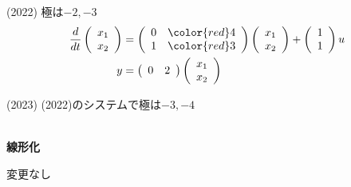 (2022) 極は{\color{red}$-2, -3$}
\begin{align*}
	\frac{d}{dt}
	\left (
	\begin{array}{c}
	 x_1 \\ x_2 
	\end{array}
	\right )
	& = 
	\left (
	\begin{array}{cc}
	 0 & {\color{red}4} \\
	 1 & {\color{red}3}
	\end{array}
	\right )
	\left (
	\begin{array}{c}
	 x_1 \\ x_2 
	\end{array}
	\right )
	+
	\left (
	\begin{array}{c}
	 1 \\ 1 
	\end{array}
	\right )
	u
\\
	y&=
	\left ( \begin{array}{cc}
		0 & 2 
	\end{array} \right )
	\left (	\begin{array}{c}
		x_1 \\ x_2 
	\end{array} \right )
\end{align*}

(2023) (2022)のシステムで極は{\color{red}$-3, -4$}

\ \\ \noindent
{\bf 線形化}

変更なし




